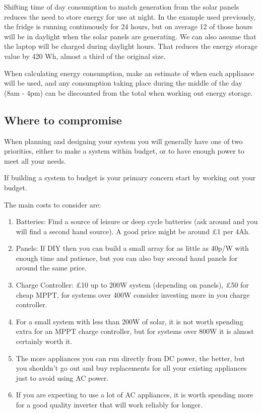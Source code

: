 \documentclass{article}
\theoremstyle{definition}
\theoremstyle{definition}
\theoremstyle{remark}
\begin{document}
    Shifting time of day consumption to match generation from the solar panels reduces the need to store energy for use at night. In the example used previously, the fridge is running continuously for 24 hours, but on average 12 of those hours will be in daylight when the solar panels are generating. We can also assume that the laptop will be charged during daylight hours. That reduces the energy storage value by 420 Wh, almost a third of the original size. 

    When calculating energy consumption, make an estimate of when each appliance will be used, and any consumption taking place during the middle of the day (8am - 4pm) can be discounted from the total when working out energy storage.
  

  {\color{blue}\subsection{Where to compromise}} %
  \label{sub:where_to_compromise}

    When planning and designing your system you will generally have one of two priorities, either to make a system within budget, or to have enough power to meet all your needs.

    If building a system to budget is your primary concern start by working out your budget. 

    The main costs to consider are:

    \begin{enumerate}
      \item Batteries: Find a source of leisure or deep cycle batteries (ask around and you will find a second hand source). A good price might be around £1 per 4Ah.
      \item Panels: If DIY then you can build a small array for as little as 40p/W with enough time and patience, but you can also buy second hand panels for around the same price.
      \item Charge Controller: £10 up to 200W system (depending on panels), £50 for cheap MPPT, for systems over 400W consider investing more in you charge controller.
      \item For a small system with less than 200W of solar, it is not worth spending extra for an MPPT charge controller, but for systems over 800W it is almost certainly worth it.
      \item The more appliances you can run directly from DC power, the better, but you shouldn’t go out and buy replacements for all your existing appliances just to avoid using AC power.
      \item If you are expecting to use a lot of AC appliances, it is worth spending more for a good quality inverter that will work reliably for longer.
    \end{enumerate}
\end{document}
